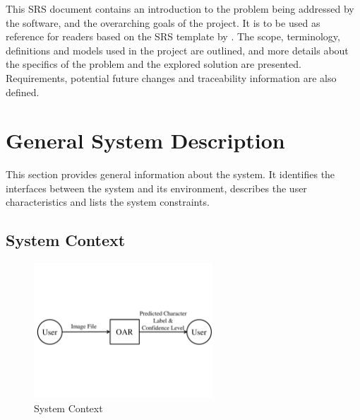 \documentclass[12pt]{article}
\begin{document}
  This SRS document contains an introduction to the problem being addressed by the software,
  and the overarching goals of the project. It is to be used as reference for readers based on the
  SRS template by \citet{SmithAndLai2005, SmithEtAl2007}. The scope, terminology, definitions
  and models used in the project are outlined, and more details about the specifics of the problem and the explored
  solution are presented. Requirements, potential future changes and traceability information are also defined.

\section{General System Description}

This section provides general information about the system.  It identifies the
interfaces between the system and its environment, describes the user
characteristics and lists the system constraints.  

\subsection{System Context}

\begin{figure}[h!]
\begin{center}
 \includegraphics[width=0.6\textwidth]{SystemContextFigure}
\caption{System Context}
\label{Fig_SystemContext} 
\end{center}
\end{figure}
\end{document}
